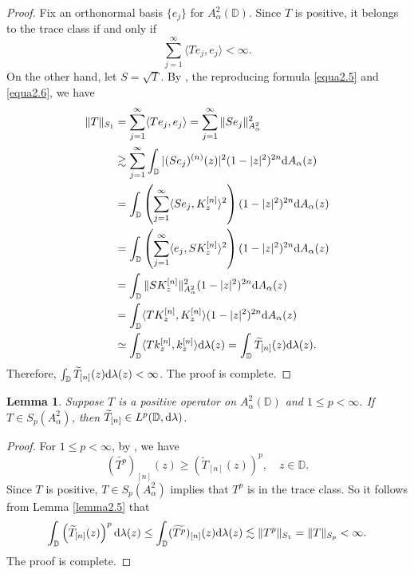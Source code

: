 \documentclass[preprint,12pt,times]{elsarticle}
\newtheorem{lemma}[theorem]{Lemma}
\theoremstyle{definition}
\theoremstyle{remark}
\numberwithin{equation}{section}
\begin{document}
\begin{proof}
Fix an orthonormal basis $\{e_j\}$ for $A_{\alpha}^2(\mathbb{D})$. Since $T$ is positive, it belongs to the trace class if and only if
$$\sum_{j=1}^{\infty}\langle Te_j,e_j\rangle<\infty.$$
On the other hand, let $S=\sqrt{T}$. By \cite[Theorem 4.28]{29}, the reproducing formula \eqref{equa2.5} and \eqref{equa2.6}, we have
\begin{align*}
\|T\|_{S_1}&=\sum_{j=1}^{\infty}\langle Te_j,e_j\rangle=\sum_{j=1}^{\infty}\|Se_j\|_{A_{\alpha}^2}^2\\
&\gtrsim \sum_{j=1}^{\infty}\int_{\mathbb{D}}|(Se_j)^{(n)}(z)|^2(1-|z|^2)^{2n}{\rm d}A_{\alpha}(z)\\
&=\int_{\mathbb{D}}\left(\sum_{j=1}^{\infty}\langle Se_j, K_z^{[n]} \rangle^2\right)(1-|z|^2)^{2n}{\rm d}A_{\alpha}(z)\\
&=\int_{\mathbb{D}}\left(\sum_{j=1}^{\infty}\langle e_j, SK_z^{[n]}\rangle ^2\right)(1-|z|^2)^{2n}{\rm d}A_{\alpha}(z)\\
&=\int_{\mathbb{D}}\|SK_z^{[n]}\|_{A_{\alpha}^2}^2(1-|z|^2)^{2n}{\rm d}A_{\alpha}(z)\\
&=\int_{\mathbb{D}}\langle TK_z^{[n]}, K_z^{[n]}\rangle (1-|z|^2)^{2n}{\rm d}A_{\alpha}(z)\\
&\simeq \int_{\mathbb{D}}\langle Tk_z^{[n]}, k_z^{[n]}\rangle {\rm d}\lambda(z)=\int_{\mathbb{D}}\widetilde{T}_{[n]}(z){\rm d}{\lambda}(z).
\end{align*}
Therefore, $\int_{\mathbb{D}}\widetilde{T}_{[n]}(z){\rm d}\lambda(z)<\infty$. The proof is complete.
\end{proof}

\begin{lemma}\label{lemma2.6}
Suppose $T$ is a positive operator on $A_{\alpha}^2(\mathbb{D})$ and $1\leq p< \infty$. If $T\in S_p(A_{\alpha}^2)$, then $\widetilde{T}_{[n]}\in L^p(\mathbb{D},{\rm d}\lambda)$.
\end{lemma}

\begin{proof}
For $1\leq p<\infty$, by \cite[Proposition 1.31]{29}, we have
\[(\widetilde{T^p})_{[n]}(z)\geq \left(\widetilde{T}_{[n]}(z)\right)^p,\quad z\in\mathbb{D}.\]
Since $T$ is positive, $T\in S_p(A_{\alpha}^2)$ implies that $T^p$ is in the trace class. So it follows from Lemma \ref{lemma2.5} that
\begin{equation*}
\int_{\mathbb{D}}\left(\widetilde{T}_{[n]}(z)\right)^p{\rm d}\lambda(z)\leq\int_{\mathbb{D}}(\widetilde{T^p})_{[n]}(z){\rm d}\lambda(z)\lesssim \|T^p\|_{S_1}=\|T\|_{S_p}<\infty.
\end{equation*}
The proof is complete.
\end{proof}
\end{document}
